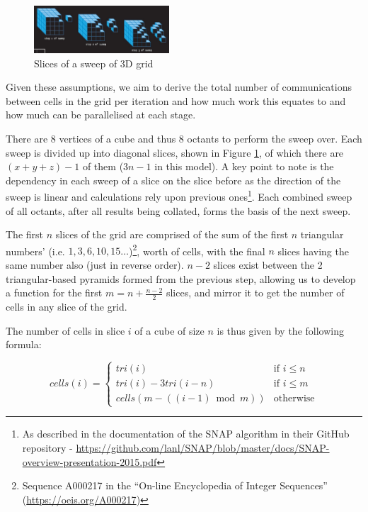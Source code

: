 \documentclass[conference]{IEEEtran}
\begin{document}
\begin{figure}[h!]
\centering
\includegraphics[width=0.45\textwidth]{images/Sweep.jpg}
\caption{Slices of a sweep of 3D grid}
\label{fig:3dsweepslice}
\end{figure}

Given these assumptions, we aim to derive the total number of communications between cells in the grid per iteration and how much work this equates to and how much can be parallelised at each stage.

There are $ 8 $ vertices of a cube and thus $ 8 $ octants to perform the sweep over. Each sweep is divided up into diagonal slices, shown in Figure \ref{fig:3dsweepslice}, of which there are $ (x + y + z) - 1 $ of them ($ 3n - 1 $ in this model). A key point to note is the dependency in each sweep of a slice on the slice before as the direction of the sweep is linear and calculations rely upon previous ones\footnote{As described in the documentation of the SNAP algorithm in their GitHub repository - \url{ https://github.com/lanl/SNAP/blob/master/docs/SNAP-overview-presentation-2015.pdf}}. Each combined sweep of all octants, after all results being collated, forms the basis of the next sweep.

The first $ n $ slices of the grid are comprised of the sum of the first $ n $ triangular numbers’ (i.e. $ 1, 3, 6, 10, 15\dots $)\footnote{Sequence A000217 in the ``On-line Encyclopedia of Integer Sequences'' (\url{https://oeis.org/A000217})}, worth of cells, with the final $ n $ slices having the same number also (just in reverse order). $ n - 2 $ slices exist between the 2 triangular-based pyramids formed from the previous step, allowing us to develop a function for the first $ m = n + \frac{n - 2}{2} $ slices, and mirror it to get the number of cells in any slice of the grid.

The number of cells in slice $ i $ of a cube of size $ n $ is thus given by the following formula:

\begin{equation}
cells(i) = \left\{
	\begin{array}{ll}
		tri(i) & \mbox{if } i \le n \\
		tri(i) - 3tri(i - n) & \mbox{if } i \le m \\
		cells(m - ((i - 1)\bmod m)) & \mbox{otherwise}
	\end{array}
\right.
\end{equation}
\end{document}
